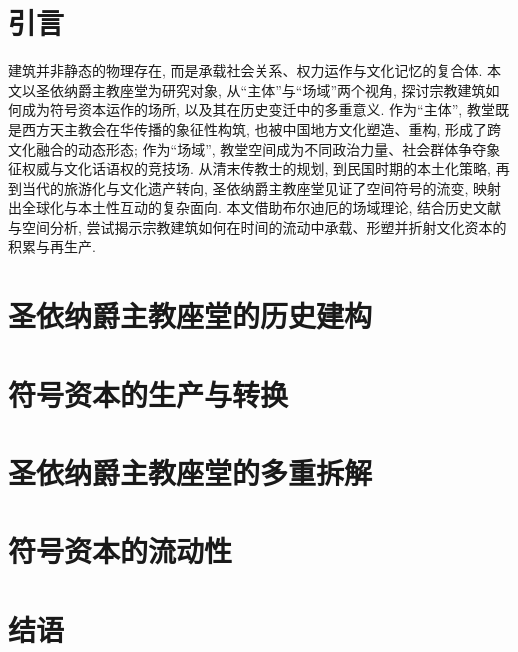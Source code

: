\documentclass[
    lang=cn,
]{spArticle}
\date{}
\begin{document}
    \section{引言}
    建筑并非静态的物理存在, 而是承载社会关系、权力运作与文化记忆的复合体. 本文以圣依纳爵主教座堂为研究对象, 从“主体”与“场域”两个视角, 探讨宗教建筑如何成为符号资本运作的场所, 以及其在历史变迁中的多重意义. 作为“主体”, 教堂既是西方天主教会在华传播的象征性构筑, 也被中国地方文化塑造、重构, 形成了跨文化融合的动态形态; 作为“场域”, 教堂空间成为不同政治力量、社会群体争夺象征权威与文化话语权的竞技场. 从清末传教士的规划, 到民国时期的本土化策略, 再到当代的旅游化与文化遗产转向, 圣依纳爵主教座堂见证了空间符号的流变, 映射出全球化与本土性互动的复杂面向. 本文借助布尔迪厄的场域理论, 结合历史文献与空间分析, 尝试揭示宗教建筑如何在时间的流动中承载、形塑并折射文化资本的积累与再生产.

    \section{圣依纳爵主教座堂的历史建构}
    \lipsum[2]

    \section{符号资本的生产与转换}
    \lipsum[3]

    \section{圣依纳爵主教座堂的多重拆解}
    \lipsum[4]

    \section{符号资本的流动性}
    \lipsum[5]

    \section{结语}
    \lipsum[6]
\end{document}
